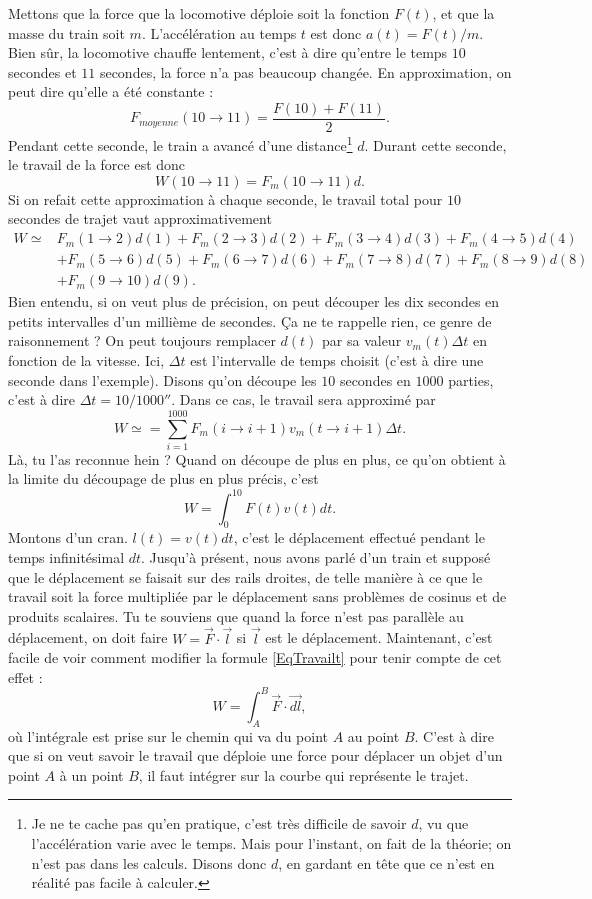 Mettons que la force que la locomotive déploie soit la fonction $F(t)$, et que la masse du train soit $m$. L'accélération au temps $t$ est donc $a(t)=F(t)/m$. Bien sûr, la locomotive chauffe lentement, c'est à dire qu'entre le temps $10$ secondes et $11$ secondes, la force n'a pas beaucoup changée. En approximation, on peut dire qu'elle a été constante :
\[ 
  F_{moyenne}(10\to 11)=\frac{ F(10)+F(11) }{ 2 }.
\]
Pendant cette seconde, le train a avancé d'une distance\footnote{Je ne te cache pas qu'en pratique, c'est très difficile de savoir $d$, vu que l'accélération varie avec le temps. Mais pour l'instant, on fait de la théorie; on n'est pas dans les calculs. Disons donc $d$, en gardant en tête que ce n'est en réalité pas facile à calculer.} $d$. Durant cette seconde, le travail de la force est donc 
\[ 
  W(10\to11)=F_{m}(10\to 11)d.
\]
Si on refait cette approximation à chaque seconde, le travail total pour $10$ secondes de trajet vaut approximativement
\[ 
\begin{split}
  W\simeq&F_{m}(1\to 2)d(1)+F_{m}(2\to 3)d(2)+F_{m}(3\to 4)d(3)+F_{m}(4\to 5)d(4)\\
		&+F_{m}(5\to 6)d(5)+F_{m}(6\to 7)d(6)+F_{m}(7\to 8)d(7)+F_{m}(8\to 9)d(8)\\
		&+F_{m}(9\to 10)d(9).
\end{split}
\]
Bien entendu, si on veut plus de précision, on peut découper les dix secondes en petits intervalles d'un millième de secondes. Ça ne te rappelle rien, ce genre de raisonnement ? On peut toujours remplacer $d(t)$ par sa valeur $v_m(t)\Delta t$ en fonction de la vitesse. Ici, $\Delta t$ est l'intervalle de temps choisit (c'est à dire une seconde dans l'exemple). Disons qu'on découpe les $10$ secondes en $1000$ parties, c'est à dire $\Delta t=\unit{10/1000}{\second}$. Dans ce cas, le travail sera approximé par
\[ 
  W\simeq=\sum_{i=1}^{1000}F_m(i\to i+1)v_m(t\to i+1)\Delta t.
\]
Là, tu l'as reconnue hein ? Quand on découpe de plus en plus, ce qu'on obtient à la limite du découpage de plus en plus précis, c'est
\begin{equation}	\label{EqTravailt}
W=\int_0^{10} F(t)v(t)dt.
\end{equation}
Montons d'un cran. $l(t)=v(t)dt$, c'est le déplacement effectué pendant le temps \og infinitésimal\fg{} $dt$. Jusqu'à présent, nous avons parlé d'un train et supposé que le déplacement se faisait sur des rails droites, de telle manière à ce que le travail soit la force multipliée par le déplacement sans problèmes de cosinus et de produits scalaires. Tu te souviens que quand la force n'est pas parallèle au déplacement, on doit faire $W=\overrightarrow{ F }\cdot\overrightarrow{ l }$ si $\overrightarrow{ l }$ est le déplacement. Maintenant, c'est facile de voir comment modifier la formule \eqref{EqTravailt} pour tenir compte de cet effet :
\begin{equation}
	W=\int_A^B \overrightarrow{ F }\cdot \overrightarrow{ dl },
\end{equation}
où l'intégrale est prise sur le chemin qui va du point $A$ au point $B$. C'est à dire que si on veut savoir le travail que déploie une force pour déplacer un objet d'un point $A$ à un point $B$, il faut intégrer sur la courbe qui représente le trajet.


